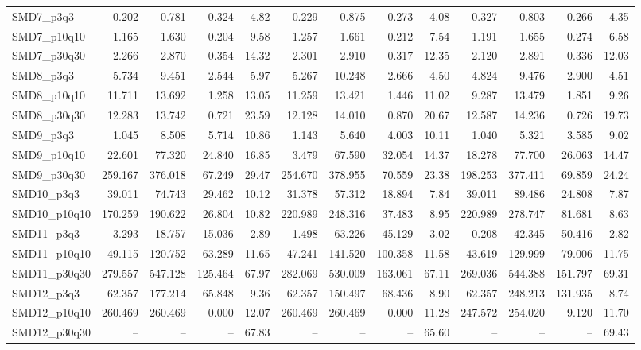 \begin{longtable}{lrrrrrrrrrrrr}
SMD7\_p3q3 & 0.202 & 0.781 & 0.324 & 4.82 & 0.229 & 0.875 & 0.273 & 4.08 & 0.327 & 0.803 & 0.266 & 4.35 \\
SMD7\_p10q10 & 1.165 & 1.630 & 0.204 & 9.58 & 1.257 & 1.661 & 0.212 & 7.54 & 1.191 & 1.655 & 0.274 & 6.58 \\
SMD7\_p30q30 & 2.266 & 2.870 & 0.354 & 14.32 & 2.301 & 2.910 & 0.317 & 12.35 & 2.120 & 2.891 & 0.336 & 12.03 \\
SMD8\_p3q3 & 5.734 & 9.451 & 2.544 & 5.97 & 5.267 & 10.248 & 2.666 & 4.50 & 4.824 & 9.476 & 2.900 & 4.51 \\
SMD8\_p10q10 & 11.711 & 13.692 & 1.258 & 13.05 & 11.259 & 13.421 & 1.446 & 11.02 & 9.287 & 13.479 & 1.851 & 9.26 \\
SMD8\_p30q30 & 12.283 & 13.742 & 0.721 & 23.59 & 12.128 & 14.010 & 0.870 & 20.67 & 12.587 & 14.236 & 0.726 & 19.73 \\
SMD9\_p3q3 & 1.045 & 8.508 & 5.714 & 10.86 & 1.143 & 5.640 & 4.003 & 10.11 & 1.040 & 5.321 & 3.585 & 9.02 \\
SMD9\_p10q10 & 22.601 & 77.320 & 24.840 & 16.85 & 3.479 & 67.590 & 32.054 & 14.37 & 18.278 & 77.700 & 26.063 & 14.47 \\
SMD9\_p30q30 & 259.167 & 376.018 & 67.249 & 29.47 & 254.670 & 378.955 & 70.559 & 23.38 & 198.253 & 377.411 & 69.859 & 24.24 \\
SMD10\_p3q3 & 39.011 & 74.743 & 29.462 & 10.12 & 31.378 & 57.312 & 18.894 & 7.84 & 39.011 & 89.486 & 24.808 & 7.87 \\
SMD10\_p10q10 & 170.259 & 190.622 & 26.804 & 10.82 & 220.989 & 248.316 & 37.483 & 8.95 & 220.989 & 278.747 & 81.681 & 8.63 \\
SMD11\_p3q3 & 3.293 & 18.757 & 15.036 & 2.89 & 1.498 & 63.226 & 45.129 & 3.02 & 0.208 & 42.345 & 50.416 & 2.82 \\
SMD11\_p10q10 & 49.115 & 120.752 & 63.289 & 11.65 & 47.241 & 141.520 & 100.358 & 11.58 & 43.619 & 129.999 & 79.006 & 11.75 \\
SMD11\_p30q30 & 279.557 & 547.128 & 125.464 & 67.97 & 282.069 & 530.009 & 163.061 & 67.11 & 269.036 & 544.388 & 151.797 & 69.31 \\
SMD12\_p3q3 & 62.357 & 177.214 & 65.848 & 9.36 & 62.357 & 150.497 & 68.436 & 8.90 & 62.357 & 248.213 & 131.935 & 8.74 \\
SMD12\_p10q10 & 260.469 & 260.469 & 0.000 & 12.07 & 260.469 & 260.469 & 0.000 & 11.28 & 247.572 & 254.020 & 9.120 & 11.70 \\
SMD12\_p30q30 & -- & -- & -- & 67.83 & -- & -- & -- & 65.60 & -- & -- & -- & 69.43 \\
\end{longtable}
\endgroup


